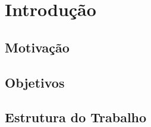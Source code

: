 \chapter{Introdução}
\label{cap:intro}

\lipsum[1]

\section{Motivação}
\label{sec:motivacao}

\lipsum[2]

\section{Objetivos}
\label{sec:objetivos}

\lipsum[2]

\section{Estrutura do Trabalho}
\label{sec:estrutura}

\lipsum[1]